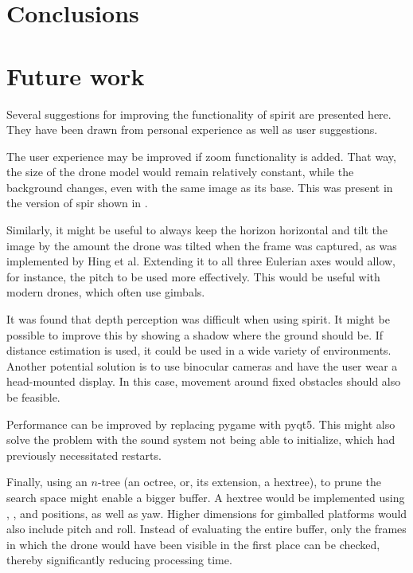 \chapter{Conclusions}
\label{ch:conclusion}
\chapter{Future work}
Several suggestions for improving the functionality of \gls{spirit} are presented here.
They have been drawn from personal experience as well as user suggestions.

The user experience may be improved if zoom functionality is added.
That way, the size of the drone model would remain relatively constant, while the background changes, even with the same image as its base.
This was present in the version of \gls{spir} shown in \cite{ito2008}.

Similarly, it might be useful to always keep the horizon horizontal and tilt the image by the amount the drone was tilted when the frame was captured, as was implemented by Hing et al.\cite{hing2009}
Extending it to all three Eulerian axes would allow, for instance, the pitch to be used more effectively.
This would be useful with modern drones, which often use gimbals.

It was found that depth perception was difficult when using \gls{spirit}.
It might be possible to improve this by showing a shadow where the ground should be.
If distance estimation is used, it could be used in a wide variety of environments.
Another potential solution is to use binocular cameras and have the user wear a head-mounted display.
In this case, movement around fixed obstacles should also be feasible.

Performance can be improved by replacing \gls{pygame} with \gls{pyqt5}.
This might also solve the problem with the sound system not being able to initialize, which had previously necessitated restarts.

Finally, using an $n$-tree (an octree, or, its extension, a hextree), to prune the search space might enable a bigger buffer.
A hextree would be implemented using , , and  positions, as well as yaw.
Higher dimensions for gimballed platforms would also include pitch and roll.
Instead of evaluating the entire buffer, only the frames in which the drone would have been visible in the first place can be checked, thereby significantly reducing processing time.
